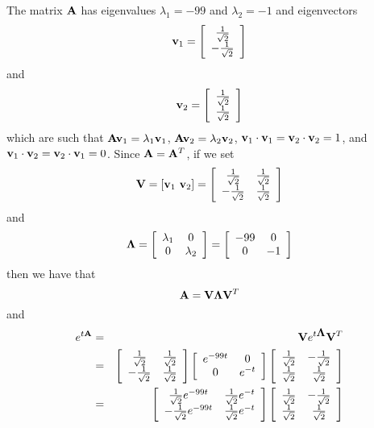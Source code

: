 \begin{solution}
\begin{enumerate}
The matrix ${\bf A}$ has eigenvalues $\lambda_1 = -99$ and $\lambda_2 = -1$ and eigenvectors
\[
{\bf v}_1 = \left[\begin{array}{c}{1\over\sqrt{2}} \\ -{1\over\sqrt{2}}\end{array}\right]
\]
and
\[
{\bf v}_2 = \left[\begin{array}{c}{1\over\sqrt{2}} \\ {1\over\sqrt{2}}\end{array}\right]
\]
which are such that ${\bf A}{\bf v}_1=\lambda_1{\bf v}_1$, ${\bf A}{\bf v}_2=\lambda_2{\bf v}_2$, ${\bf v}_1\cdot{\bf v}_1={\bf v}_2\cdot{\bf v}_2=1$,  and ${\bf v}_1\cdot{\bf v}_2={\bf v}_2\cdot{\bf v}_1=0$. Since ${\bf A}={\bf A}^T$, if we set
\[
\BV = [\Bv_1\ \Bv_2]=\left[\begin{array}{cc}{1\over\sqrt{2}} & {1\over\sqrt{2}} \\ -{1\over\sqrt{2}} & {1\over\sqrt{2}}\end{array}\right]
\]
and
\[
\mbox{\boldmath$\Lambda$} = \left[\begin{array}{cc}\lambda_1 & 0 \\ 0 & \lambda_2\end{array}\right]=\left[\begin{array}{cc}-99 & 0 \\ 0 & -1\end{array}\right]
\]
then we have that
\[
{\bf A} = {\bf V}\mbox{\boldmath$\Lambda$}{\bf V}^T
\]
and
\begin{eqnarray*}
e^{t\BA}&=&\BV e^{t\BLambda} \BV^T
\\
&=&\left[\begin{array}{cc}{1\over\sqrt{2}} & {1\over\sqrt{2}} \\ -{1\over\sqrt{2}} & {1\over\sqrt{2}}\end{array}\right] \left[\begin{array}{cc}e^{-99t} & 0 \\ 0 & e^{-t}\end{array}\right] \left[\begin{array}{cc}{1\over\sqrt{2}} & -{1\over\sqrt{2}} \\ {1\over\sqrt{2}} & {1\over\sqrt{2}}\end{array}\right]
\\
&=&\left[\begin{array}{cc}{1\over\sqrt{2}}e^{-99t} & {1\over\sqrt{2}}e^{-t} \\ -{1\over\sqrt{2}}e^{-99t} & {1\over\sqrt{2}}e^{-t}\end{array}\right] \left[\begin{array}{cc}{1\over\sqrt{2}} & -{1\over\sqrt{2}} \\ {1\over\sqrt{2}} & {1\over\sqrt{2}}\end{array}\right]

\end{eqnarray*}
\end{enumerate}
\end{solution}

